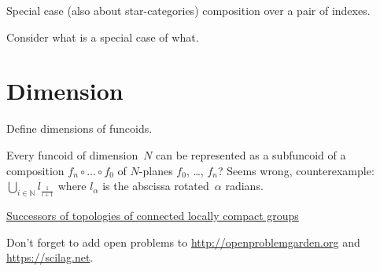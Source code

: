 \documentclass{amsart}
\begin{document}
Special case (also about star-categories) composition over a pair of indexes.

Consider what is a special case of what.

\section{Dimension}

Define dimensions of funcoids.

Every funcoid of dimension~$N$ can be represented as
a subfuncoid of a composition $f_n\circ\dots\circ f_0$ of $N$-planes
$f_0$, \dots, $f_n$? Seems wrong, counterexample:
$\bigcup_{i\in\mathbb{N}} l_{\frac{1}{i+1}}$ where $l_\alpha$ is the
abscissa rotated~$\alpha$ radians.

\href{https://www.researchgate.net/publication/382445556_Successors_of_topologies_of_connected_locally_compact_groups}{Successors of topologies of connected locally compact groups}

Don't forget to add open problems to
\url{http://openproblemgarden.org} and
\url{https://scilag.net}.



\end{document}
